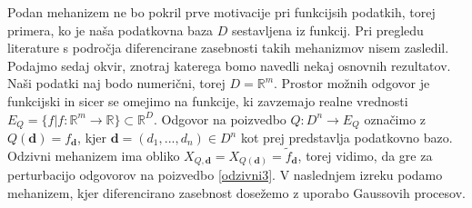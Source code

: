 \documentclass[12pt,a4paper]{amsart}
\theoremstyle{definition} %
\theoremstyle{plain} %
\begin{document}
\newline
\newline
Podan mehanizem ne bo pokril prve motivacije pri funkcijsih podatkih, torej primera, ko je naša podatkovna baza $D$ sestavljena iz funkcij. Pri pregledu literature s področja diferencirane zasebnosti takih mehanizmov nisem zasledil.
\newline
\newline
Podajmo sedaj okvir, znotraj katerega bomo navedli nekaj osnovnih rezultatov. Naši podatki naj bodo numerični, torej $D=\mathbb{R}^m$. Prostor možnih odgovor je funkcijski in sicer se omejimo na funkcije, ki zavzemajo realne vrednosti $E_Q = \{f | f : \mathbb{R}^m \rightarrow \mathbb{R}\} \subset \mathbb{R}^D$. Odgovor na poizvedbo $Q: D^n \rightarrow E_Q$ označimo z $Q(\textbf{d})=f_{\textbf{d}}$, kjer $\textbf{d} = (d_1,...,d_n) \in D^n$ kot prej predstavlja podatkovno bazo. Odzivni mehanizem ima obliko $X_{Q,\textbf{d}} = X_{Q(\textbf{d})} = \widetilde{f}_{\textbf{d}} $, torej vidimo, da gre za perturbacijo odgovorov na poizvedbo \eqref{odzivni3}. V naslednjem izreku podamo mehanizem, kjer diferencirano zasebnost dosežemo z uporabo Gaussovih procesov.
\end{document}
